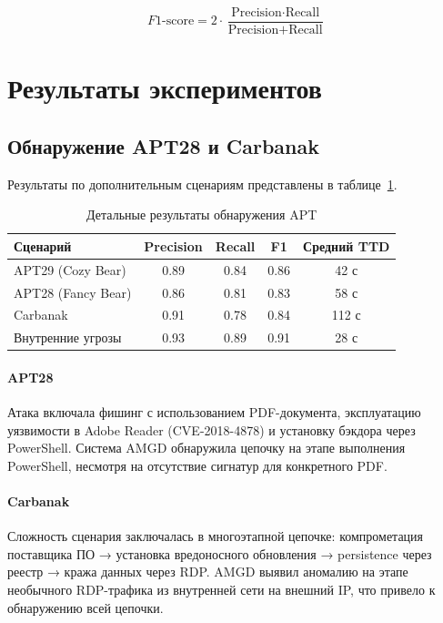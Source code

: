 \begin{equation}
    F1\text{-score} = 2 \cdot \frac{\text{Precision} \cdot \text{Recall}}{\text{Precision} + \text{Recall}}
    \label{eq:f1}
\end{equation}

\section{Результаты экспериментов}\label{sec:ch4/sect4}

\subsection{Обнаружение APT28 и Carbanak}

Результаты по дополнительным сценариям представлены в таблице~\ref{tab:detailed_results}.

\begin{table}[ht]
\centering
\caption{Детальные результаты обнаружения APT}
\label{tab:detailed_results}
\begin{tabular}{lcccc}
\toprule
Сценарий & Precision & Recall & F1 & Средний TTD \\
\midrule
APT29 (Cozy Bear) & 0.89 & 0.84 & 0.86 & 42 с \\
APT28 (Fancy Bear) & 0.86 & 0.81 & 0.83 & 58 с \\
Carbanak & 0.91 & 0.78 & 0.84 & 112 с \\
Внутренние угрозы & 0.93 & 0.89 & 0.91 & 28 с \\
\bottomrule
\end{tabular}
\end{table}

\paragraph{APT28}
Атака включала фишинг с использованием PDF-документа, эксплуатацию уязвимости в Adobe Reader (CVE-2018-4878) и установку бэкдора через PowerShell. Система AMGD обнаружила цепочку на этапе выполнения PowerShell, несмотря на отсутствие сигнатур для конкретного PDF.

\paragraph{Carbanak}
Сложность сценария заключалась в многоэтапной цепочке: компрометация поставщика ПО → установка вредоносного обновления → persistence через реестр → кража данных через RDP. AMGD выявил аномалию на этапе необычного RDP-трафика из внутренней сети на внешний IP, что привело к обнаружению всей цепочки.

